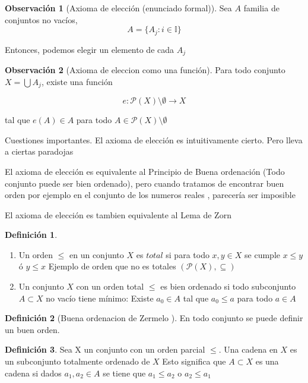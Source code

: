 \documentclass[12pt]{article}
\newcommand{\I}{\mathbb{I}}
\newcommand{\ra}{\rightarrow}
\theoremstyle{definition}
\newtheorem{definition}{Definición}[section]
\newtheorem*{remark}{Observación}
\begin{document}
\begin{remark}[Axioma de elección (enunciado formal)]
  Sea $A$ familia de conjuntos no vacíos, 
  $$ A = \{A_{j}: i \in \I\}$$

  Entonces, podemos elegir un elemento de cada $A_{j}$
\end{remark}

\begin{remark}[Axioma de eleccion como una función] 

  Para todo conjunto $X = \bigcup A_{j}$, existe una función 

  $$e: \mathcal{P}(X) \setminus \emptyset \ra X$$

tal que $e(A) \in A$ para todo $A \in \mathcal{P}(X) \setminus \emptyset$
\end{remark}

Cuestiones importantes. El axioma de elección es intuitivamente cierto. Pero lleva a ciertas paradojas

El axioma de elección es equivalente al Principio de Buena ordenación (Todo conjunto puede ser bien ordenado), pero cuando tratamos de encontrar buen orden por ejemplo en el conjunto de los numeros reales , parecería ser imposible 

El axioma de elección es tambien equivalente al Lema de Zorn

\begin{definition} $ $ 
  \begin{enumerate}
    \item Un orden $\leq$ en un conjunto $X$ es $total$ si para todo $x,y \in X$ se cumple $x \leq y$ ó $y \leq x$  
Ejemplo de orden que no es totales $(\mathcal{P}(X), \subseteq)$
\item Un conjunto $X$ con un orden total $\leq$ es bien ordenado si todo subconjunto $A \subset X$ no vacío tiene mínimo: Existe $a_{0} \in A$ tal que $a_{0} \leq a$ para todo $a \in A$
\end{enumerate}
\end{definition}

\begin{definition}[Buena ordenacion de Zermelo ]
  En todo conjunto se puede definir un buen orden.
\end{definition}

\begin{definition}
  Sea X un conjunto con un orden parcial $\leq$. Una cadena en $X$ es un subconjunto totalmente ordenado de $X$ 
  Esto significa que $A \subset X$ es una cadena si dados $a_{1}, a_{2} \in A$ se tiene que $a_{1} \leq a_{2}$ o $a_{2} \leq a_{1}$
\end{definition}
\end{document}
